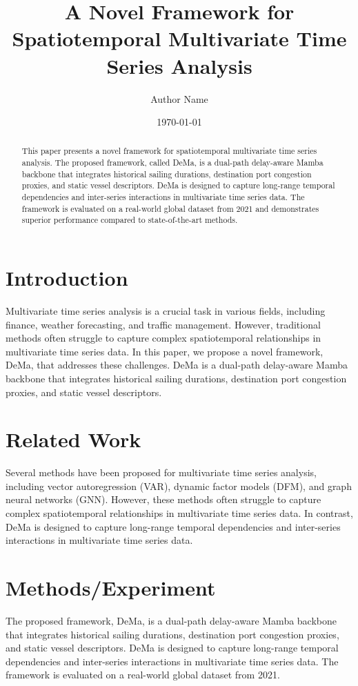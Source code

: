 \documentclass[12pt]{article}
\begin{document}
        \title{A Novel Framework for Spatiotemporal Multivariate Time Series Analysis}
        \author{Author Name}
        \date{\today}

        \maketitle

        \begin{abstract}
        This paper presents a novel framework for spatiotemporal multivariate time series analysis. The proposed framework, called DeMa, is a dual-path delay-aware Mamba backbone that integrates historical sailing durations, destination port congestion proxies, and static vessel descriptors. DeMa is designed to capture long-range temporal dependencies and inter-series interactions in multivariate time series data. The framework is evaluated on a real-world global dataset from 2021 and demonstrates superior performance compared to state-of-the-art methods.
        \end{abstract}

        \section{Introduction}
        Multivariate time series analysis is a crucial task in various fields, including finance, weather forecasting, and traffic management. However, traditional methods often struggle to capture complex spatiotemporal relationships in multivariate time series data. In this paper, we propose a novel framework, DeMa, that addresses these challenges. DeMa is a dual-path delay-aware Mamba backbone that integrates historical sailing durations, destination port congestion proxies, and static vessel descriptors.

        \section{Related Work}
        Several methods have been proposed for multivariate time series analysis, including vector autoregression (VAR), dynamic factor models (DFM), and graph neural networks (GNN). However, these methods often struggle to capture complex spatiotemporal relationships in multivariate time series data. In contrast, DeMa is designed to capture long-range temporal dependencies and inter-series interactions in multivariate time series data.

        \section{Methods/Experiment}
        The proposed framework, DeMa, is a dual-path delay-aware Mamba backbone that integrates historical sailing durations, destination port congestion proxies, and static vessel descriptors. DeMa is designed to capture long-range temporal dependencies and inter-series interactions in multivariate time series data. The framework is evaluated on a real-world global dataset from 2021.
\end{document}
